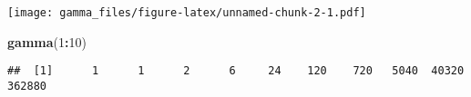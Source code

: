\documentclass[
]{article}
\newenvironment{Shaded}{\begin{snugshade}}{\end{snugshade}}
\newcommand{\DecValTok}[1]{\textcolor[rgb]{0.00,0.00,0.81}{#1}}
\newcommand{\FunctionTok}[1]{\textcolor[rgb]{0.13,0.29,0.53}{\textbf{#1}}}
\newcommand{\NormalTok}[1]{#1}
\newcommand{\SpecialCharTok}[1]{\textcolor[rgb]{0.81,0.36,0.00}{\textbf{#1}}}
\begin{document}
\texttt{[image: gamma\_files/figure-latex/unnamed-chunk-2-1.pdf]}

\begin{Shaded}
\begin{Highlighting}[]
\FunctionTok{gamma}\NormalTok{(}\DecValTok{1}\SpecialCharTok{:}\DecValTok{10}\NormalTok{)}
\end{Highlighting}
\end{Shaded}

\begin{verbatim}
##  [1]      1      1      2      6     24    120    720   5040  40320 362880
\end{verbatim}
\end{document}
